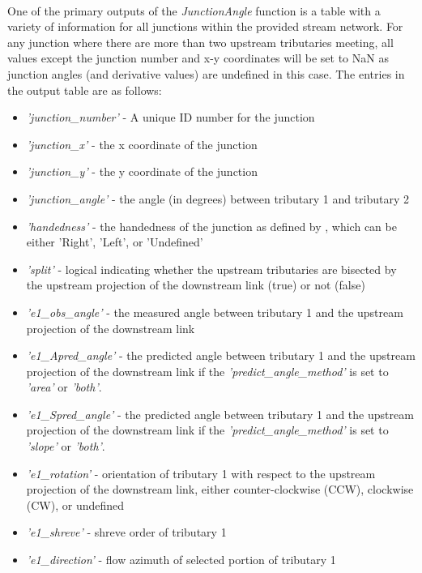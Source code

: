 \paragraph{}One of the primary outputs of the \textit{JunctionAngle} function is a table with a variety of information for all junctions within the provided stream network. For any junction where there are more than two upstream tributaries meeting, all values except the junction number and x-y coordinates will be set to NaN as junction angles (and derivative values) are undefined in this case. The entries in the output table are as follows:

\begin{itemize}
	\item \textit{'junction\_number'} - A unique ID number for the junction
	\item \textit{'junction\_x'} - the x coordinate of the junction
	\item \textit{'junction\_y'} - the y coordinate of the junction
	\item \textit{'junction\_angle'} - the angle (in degrees) between tributary 1 and tributary 2
	\item \textit{'handedness'} - the handedness of the junction as defined by \cite{James1969}, which can be either 'Right', 'Left', or 'Undefined'
	\item \textit{'split'} - logical indicating whether the upstream tributaries are bisected by the upstream projection of the downstream link (true) or not (false)
	\item \textit{'e1\_obs\_angle'} - the measured angle between tributary 1 and the upstream projection of the downstream link
	\item \textit{'e1\_Apred\_angle'} - the predicted angle between tributary 1 and the upstream projection of the downstream link if the \textit{'predict\_angle\_method'} is set to \textit{'area'} or \textit{'both'}.
	\item \textit{'e1\_Spred\_angle'} - the predicted angle between tributary 1 and the upstream projection of the downstream link if the \textit{'predict\_angle\_method'} is set to \textit{'slope'} or \textit{'both'}.
	\item \textit{'e1\_rotation'} - orientation of tributary 1 with respect to the upstream projection of the downstream link, either counter-clockwise (CCW), clockwise (CW), or undefined
	\item \textit{'e1\_shreve'} - shreve order of tributary 1
	\item \textit{'e1\_direction'} - flow azimuth of selected portion of tributary 1

\end{itemize}
